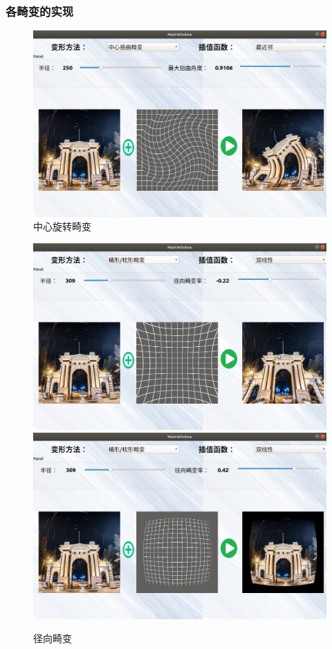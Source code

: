 \documentclass[UTF8]{ctexart}
\begin{document}
\subsubsection{各畸变的实现}
\begin{figure}[H]
    \centering
    \includegraphics[scale=0.3]{images/report-images/tangent_dis.png}
    \caption{中心旋转畸变}
\end{figure}
\begin{figure}[H]
    \centering
    \includegraphics[scale=0.3]{images/report-images/ao.png}
    \includegraphics[scale=0.3]{images/report-images/tu.png}
    \caption{径向畸变}
\end{figure}
\end{document}
